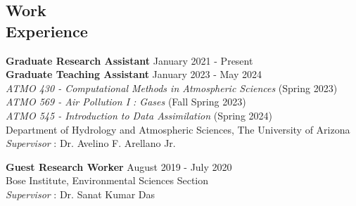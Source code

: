 \documentclass[margin,line]{resume}
\begin{document}
\begin{resume}
		\section{\mysidestyle \textbf{\textcolor{sep}{Work \\Experience}}}
		
		\textbf{Graduate Research Assistant} \hfill January 2021 - Present  \\
		\textbf{Graduate Teaching Assistant} \hfill January 2023 - May 2024  \\
		\hspace*{2mm} \textit{ATMO 430 - Computational Methods in Atmospheric Sciences} (Spring 2023) \\
		\hspace*{2mm}  \textit{ATMO 569 - Air Pollution I : Gases} (Fall Spring 2023) \\
		\hspace*{2mm}  \textit{ATMO 545 - Introduction to Data Assimilation} (Spring 2024) \\
		Department of Hydrology and Atmospheric Sciences, The University of Arizona \\
		\textit{ Supervisor} : Dr. Avelino F. Arellano Jr.
		
		\textbf{Guest Research Worker} \hfill August 2019 - July 2020 \\
		Bose Institute, Environmental Sciences Section \\
		\textit{Supervisor} : Dr. Sanat Kumar Das 
		
		\vspace*{-3mm}    
		
		

\end{resume}
\end{document}
